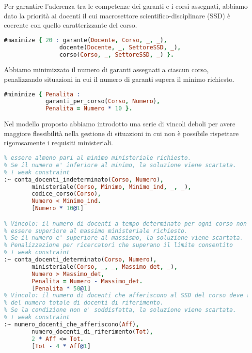 Per garantire l’aderenza tra le competenze dei garanti e i corsi assegnati,
abbiamo dato la priorità ai docenti il cui macrosettore scientifico-disciplinare (SSD)
è coerente con quello caratterizzante del corso.

\begin{lstlisting}[language=prolog, caption=Garanti con macrosettore coerente a quello del corso.]
% Ottimizzare i garanti con SSD caratterizzante
#maximize { 20 : garante(Docente, Corso, _, _), 
                docente(Docente, _, SettoreSSD, _), 
                corso(Corso, _, SettoreSSD, _) }.
\end{lstlisting}

Abbiamo minimizzato il numero di garanti assegnati a ciascun corso, penalizzando
situazioni in cui il numero di garanti supera il minimo richiesto.

\begin{lstlisting}[language=prolog, caption=Minimizzazione dei garanti per corso di laurea.]
% Minimizzo il numero di garanti per ogni corso
#minimize { Penalita : 
            garanti_per_corso(Corso, Numero),
            Penalita = Numero * 10 }.
\end{lstlisting}

Nel modello proposto abbiamo introdotto una serie di vincoli deboli per avere
maggiore flessibilità nella gestione di situazioni in cui non è possibile rispettare
rigorosamente i requisiti ministeriali.

\begin{lstlisting}[language=prolog, caption=Vincoli di flessibilità]
% Vincolo: il numero di docenti a tempo indeterminato per ogni corso deve
% essere almeno pari al minimo ministeriale richiesto.
% Se il numero e' inferiore al minimo, la soluzione viene scartata.
% ! weak constraint
:~ conta_docenti_indeterminato(Corso, Numero),
        ministeriale(Corso, Minimo, Minimo_ind, _, _),
        codice_corso(Corso),
        Numero < Minimo_ind.
        [Numero * 10@1]

% Vincolo: il numero di docenti a tempo determinato per ogni corso non deve
% essere superiore al massimo ministeriale richiesto.
% Se il numero e' superiore al massismo, la soluzione viene scartata.
% Penalizzazione per ricercatori che superano il limite consentito
% ! weak constraint
:~ conta_docenti_determinato(Corso, Numero),
        ministeriale(Corso, _, _, Massimo_det, _),
        Numero > Massimo_det,
        Penalita = Numero - Massimo_det.
        [Penalita * 50@1]
% Vincolo: il numero di docenti che afferiscono al SSD del corso deve rappresentare almeno il 50%
% del numero totale di docenti di riferimento.
% Se la condizione non e' soddisfatta, la soluzione viene scartata.
% ! weak constraint
:~ numero_docenti_che_afferiscono(Aff), 
        numero_docenti_di_riferimento(Tot),
        2 * Aff <= Tot. 
        [Tot - 4 * Aff@1]
\end{lstlisting}

